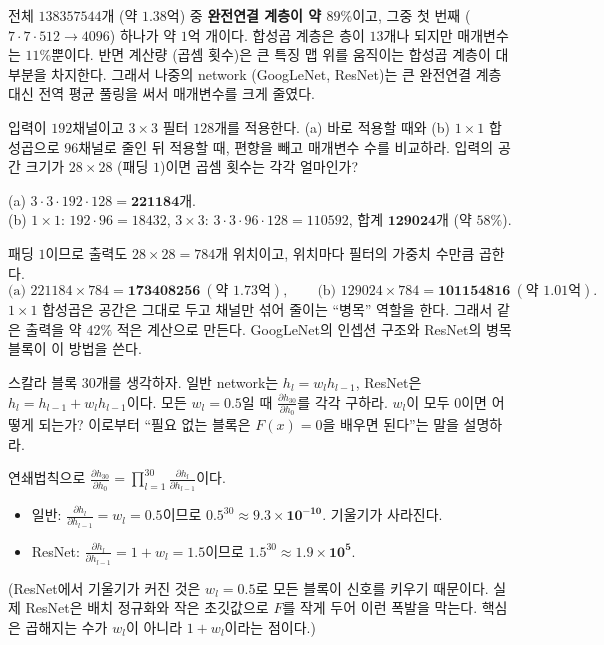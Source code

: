 \documentclass[11pt,a4paper]{article}
\newcommand{\pd}[2]{\frac{\partial #1}{\partial #2}}
\begin{document}
\begin{problems}
\begin{sol}
전체 $138357544$개 (약 $1.38$억) 중 \textbf{완전연결 계층이 약 $89\%$}이고, 그중 첫 번째 ($7\cdot7\cdot512\to4096$) 하나가 약 $1$억 개이다.
합성곱 계층은 층이 $13$개나 되지만 매개변수는 $11\%$뿐이다. 반면 계산량 (곱셈 횟수)은 큰 특징 맵 위를 움직이는 합성곱 계층이 대부분을 차지한다.
그래서 나중의 network (GoogLeNet, ResNet)는 큰 완전연결 계층 대신 전역 평균 풀링을 써서 매개변수를 크게 줄였다.
\end{sol}

\item 입력이 $192$채널이고 $3\times3$ 필터 $128$개를 적용한다. (a) 바로 적용할 때와 (b) $1\times1$ 합성곱으로 $96$채널로 줄인 뒤 적용할 때,
편향을 빼고 매개변수 수를 비교하라. 입력의 공간 크기가 $28\times28$ (패딩 $1$)이면 곱셈 횟수는 각각 얼마인가?

\begin{sol}
(a) $3\cdot3\cdot192\cdot128=\mathbf{221184}$개.\\
(b) $1\times1$: $192\cdot96=18432$, $3\times3$: $3\cdot3\cdot96\cdot128=110592$, 합계 $\mathbf{129024}$개 (약 $58\%$).

패딩 $1$이므로 출력도 $28\times28=784$개 위치이고, 위치마다 필터의 가중치 수만큼 곱한다.
\[
\text{(a) } 221184\times784=\mathbf{173408256}\ (\text{약 }1.73\text{억}),\qquad
\text{(b) } 129024\times784=\mathbf{101154816}\ (\text{약 }1.01\text{억}).
\]
$1\times1$ 합성곱은 공간은 그대로 두고 채널만 섞어 줄이는 ``병목'' 역할을 한다. 그래서 같은 출력을 약 $42\%$ 적은 계산으로 만든다.
GoogLeNet의 인셉션 구조와 ResNet의 병목 블록이 이 방법을 쓴다.
\end{sol}

\item 스칼라 블록 $30$개를 생각하자. 일반 network는 $h_{l}=w_l h_{l-1}$, ResNet은 $h_{l}=h_{l-1}+w_l h_{l-1}$이다.
모든 $w_l=0.5$일 때 $\pd{h_{30}}{h_0}$를 각각 구하라. $w_l$이 모두 $0$이면 어떻게 되는가?
이로부터 ``필요 없는 블록은 $F(x)=0$을 배우면 된다''는 말을 설명하라.

\begin{sol}
연쇄법칙으로 $\pd{h_{30}}{h_0}=\prod_{l=1}^{30}\pd{h_l}{h_{l-1}}$이다.
\begin{itemize}[leftmargin=1.5em,itemsep=2pt]
\item 일반: $\pd{h_l}{h_{l-1}}=w_l=0.5$이므로 $0.5^{30}\approx\mathbf{9.3\times10^{-10}}$. 기울기가 사라진다.
\item ResNet: $\pd{h_l}{h_{l-1}}=1+w_l=1.5$이므로 $1.5^{30}\approx\mathbf{1.9\times10^{5}}$.
\end{itemize}
(ResNet에서 기울기가 커진 것은 $w_l=0.5$로 모든 블록이 신호를 키우기 때문이다.
실제 ResNet은 배치 정규화와 작은 초깃값으로 $F$를 작게 두어 이런 폭발을 막는다. 핵심은 곱해지는 수가 $w_l$이 아니라 $1+w_l$이라는 점이다.)


\end{sol}
\end{problems}
\end{document}
